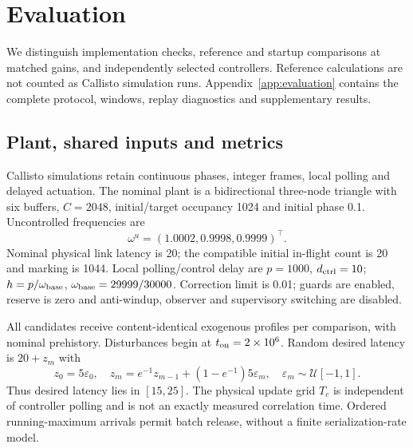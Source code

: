 \section{Evaluation}
\label{sec:evaluation}

We distinguish implementation checks, reference and startup comparisons
at matched gains, and independently selected controllers. Reference calculations
are not counted as Callisto simulation runs. Appendix~\ref{app:evaluation}
contains the complete protocol, windows, replay diagnostics and
supplementary results.

\subsection{Plant, shared inputs and metrics}
\label{subsec:eval_design}
Callisto simulations retain continuous phases, integer frames, local
polling and delayed actuation. The nominal plant is a bidirectional
three-node triangle with six buffers, $C=2048$, initial/target
occupancy 1024 and initial phase 0.1. Uncontrolled frequencies are
\[
 \omega^u=(1.0002,0.9998,0.9999)^\top.
\]
Nominal physical link latency is 20;
the compatible initial in-flight count is 20 and marking is 1044.
Local polling/control delay are $p=1000$, $d_{\rm ctrl}=10$;
$h=p/\omega_{\rm base}$, $\omega_{\rm base}=29999/30000$.
Correction limit is 0.01; guards are enabled, reserve is zero and
anti-windup, observer and supervisory switching are disabled.

All candidates receive content-identical exogenous profiles per
comparison, with nominal prehistory. Disturbances begin at
$t_{\rm on}=2\times10^6$. Random desired latency is $20+z_m$ with
\begin{equation}
 z_0=5\varepsilon_0,\quad
 z_m=e^{-1}z_{m-1}+(1-e^{-1})5\varepsilon_m,
 \quad\varepsilon_m\sim\mathcal U[-1,1].
 \label{eq:eval_random_profile}
\end{equation}
Thus desired latency lies in $[15,25]$. The physical update grid
$T_c$ is independent of controller polling and is not an exactly
measured correlation time. Ordered running-maximum arrivals permit
batch release, without a finite serialization-rate model.


